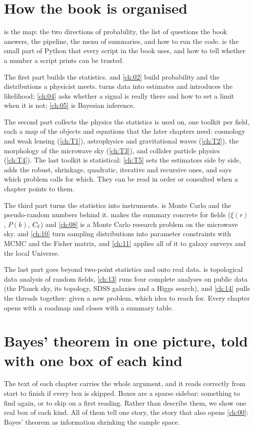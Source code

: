 \section*{How the book is organised}
 is the map: the two directions of probability, the list of
questions the book answers, the pipeline, the menu of summaries, and how to
run the code.  is the small part of Python that every script in
the book uses, and how to tell whether a number a script prints can be
trusted.

The first part builds the statistics.  and \cref{ch:02} build
probability and the distributions a physicist meets.  turns data
into estimates and introduces the likelihood; \cref{ch:04} asks whether a
signal is really there and how to set a limit when it is not; \cref{ch:05} is
Bayesian inference.

The second part collects the physics the statistics is used on, one toolkit
per field, each a map of the objects and equations that the later chapters
need: cosmology and weak lensing (\cref{ch:T1}), astrophysics and
gravitational waves (\cref{ch:T2}), the morphology of the microwave sky
(\cref{ch:T3}), and collider particle physics (\cref{ch:T4}). The last
toolkit is statistical: \cref{ch:T5} sets the estimators side by side, adds
the robust, shrinkage, quadratic, iterative and recursive ones, and says
which problem calls for which. They can be read in order or consulted when a
chapter points to them.

The third part turns the statistics into instruments.  is Monte
Carlo and the pseudo-random numbers behind it.  makes the
summary concrete for fields ($\xi(r)$, $P(k)$, $C_\ell$) and \cref{ch:08} is
a Monte Carlo research problem on the microwave sky.  and
\cref{ch:10} turn sampling distributions into parameter constraints with
MCMC and the Fisher matrix, and \cref{ch:11} applies all of it to galaxy
surveys and the local Universe.

The last part goes beyond two-point statistics and onto real data.
 is topological data analysis of random fields, \cref{ch:13}
runs four complete analyses on public data (the Planck sky, its topology,
SDSS galaxies and a Higgs search), and \cref{ch:14} pulls the threads
together: given a new problem, which idea to reach for. Every chapter opens
with a roadmap and closes with a summary table.

\section*{Bayes' theorem in one picture, told with one box of each kind}
The text of each chapter carries the whole argument, and it reads correctly
from start to finish if every box is skipped. Boxes are a sparse sidebar:
something to find again, or to skip on a first reading. Rather than describe
them, we show one real box of each kind. All of them tell one story, the
story that also opens \cref{ch:00}: Bayes' theorem as information shrinking
the sample space.

